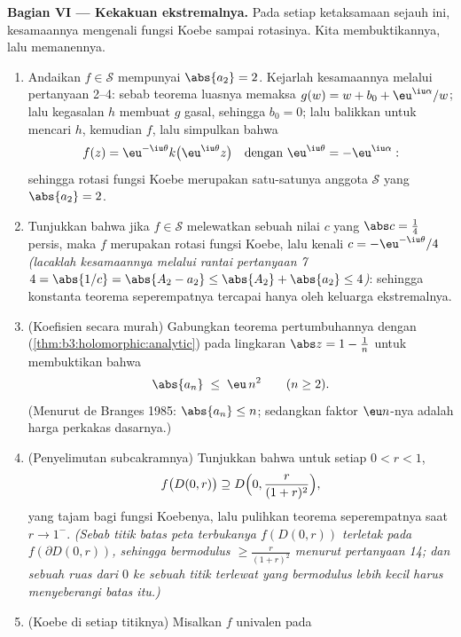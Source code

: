 \begin{problem}
\medskip
\noindent\textbf{Bagian VI --- Kekakuan ekstremalnya.} Pada setiap
ketaksamaan sejauh ini, kesamaannya mengenali fungsi Koebe sampai
rotasinya. Kita membuktikannya, lalu memanennya.
\begin{enumerate}[resume]
  \item Andaikan $f \in \mathcal S$ mempunyai $\abs{a_2} = 2$.
        Kejarlah kesamaannya melalui pertanyaan 2--4: sebab teorema
        luasnya memaksa $g(w) = w + b_0 + \eu^{\iu\alpha}/w$;
        lalu kegasalan $h$ membuat $g$ gasal, sehingga $b_0 = 0$; lalu balikkan
        untuk mencari $h$, kemudian $f$, lalu simpulkan bahwa
        \[
        f(z) = \eu^{-\iu\theta}k\bigl(\eu^{\iu\theta}z\bigr)
        \quad\text{dengan } \eu^{\iu\theta} =
        -\eu^{\iu\alpha} :
        \]
        sehingga rotasi fungsi Koebe merupakan satu-satunya
        anggota $\mathcal S$ yang $\abs{a_2} = 2$.
  \item Tunjukkan bahwa jika $f \in \mathcal S$ melewatkan sebuah nilai $c$
        yang $\abs c = \frac14$ persis, maka $f$ merupakan
        rotasi fungsi Koebe, lalu kenali $c =
        -\eu^{-\iu\theta}/4$ \emph{(lacaklah kesamaannya melalui
        rantai pertanyaan 7 $4 = \abs{1/c} = \abs{A_2 - a_2}
        \leq \abs{A_2} + \abs{a_2} \leq 4$)}: sehingga
        konstanta teorema seperempatnya tercapai hanya oleh keluarga
        ekstremalnya.
  \item (Koefisien secara murah) Gabungkan teorema
        pertumbuhannya dengan 
        (\cref{thm:b3:holomorphic:analytic}) pada lingkaran
        $\abs z = 1 - \frac1n$ untuk membuktikan bahwa
        \[
        \abs{a_n} \;\leq\; \eu\,n^2 \qquad (n \geq 2) .
        \]
        (Menurut de Branges 1985: $\abs{a_n} \leq n$; sedangkan faktor
        $\eu n$-nya adalah harga perkakas dasarnya.)
  \item (Penyelimutan subcakramnya) Tunjukkan bahwa untuk setiap $0 < r <
        1$,
        \[
        f\bigl(D(0, r)\bigr) \supseteq
        D\Bigl(0, \frac{r}{(1 + r)^2}\Bigr),
        \]
        yang tajam bagi fungsi Koebenya, lalu pulihkan
        teorema seperempatnya saat $r \to 1^-$. \emph{(Sebab titik
        batas peta terbukanya $f(D(0,r))$ terletak pada
        $f(\partial D(0,r))$, sehingga bermodulus $\geq
        \frac{r}{(1+r)^2}$ menurut pertanyaan 14; dan sebuah ruas dari
        $0$ ke sebuah titik terlewat yang bermodulus lebih kecil harus
        menyeberangi batas itu.)}
  \item (Koebe di setiap titiknya) Misalkan $f$ univalen pada

\end{enumerate}
\end{problem}
